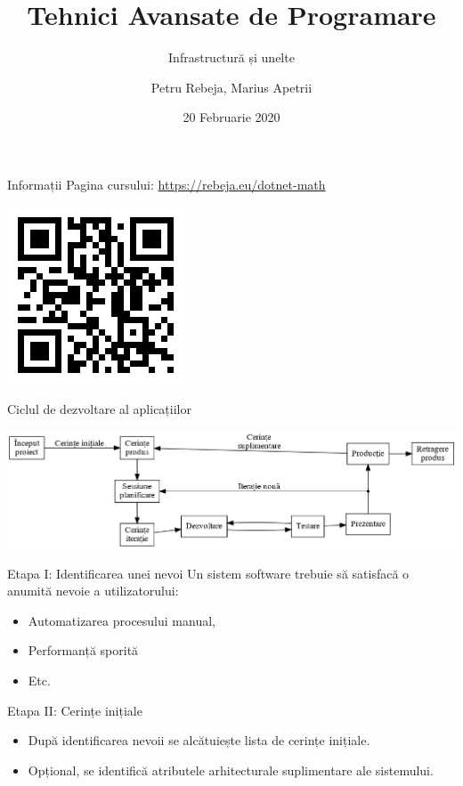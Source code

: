 \documentclass[presentation]{beamer}
\author{Petru Rebeja, Marius Apetrii}
\date{20 Februarie 2020}
\title{Tehnici Avansate de Programare}
\subtitle{Infrastructură și unelte}
\institute[UAIC]{Facultatea de Matematică\\Universitatea Alexandru Ioan Cuza, Iași}
\begin{document}
\maketitle
\begin{frame}[label={sec:orgc1b01dd}]{Informații}
Pagina cursului: \url{https://rebeja.eu/dotnet-math}

\begin{center}
\includegraphics[height=0.6\textheight]{img/qr-pagina-curs.png}
\end{center}
\end{frame}
\begin{frame}[label={sec:orgafb33b9}]{Ciclul de dezvoltare al aplicațiilor}
\begin{center}
\includegraphics[width=\textwidth]{./img/ciclul-agile.png}
\end{center}
\end{frame}
\begin{frame}[label={sec:org68989d3}]{Etapa I: Identificarea unei nevoi}
Un sistem software trebuie să satisfacă o anumită nevoie a utilizatorului:
\begin{itemize}
\item Automatizarea procesului manual,
\item Performanță sporită
\item Etc.
\end{itemize}
\end{frame}
\begin{frame}[label={sec:orge71840f}]{Etapa II: Cerințe inițiale}
\begin{itemize}
\item După identificarea nevoii se alcătuiește lista de cerințe inițiale.
\item Opțional, se identifică atributele arhitecturale suplimentare ale sistemului.
\end{itemize}
\end{frame}
\end{document}

